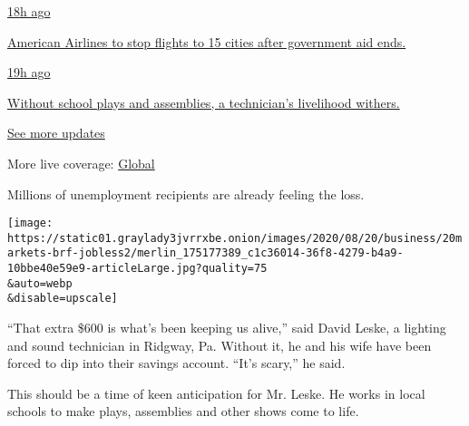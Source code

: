 \href{https://www.nytimes3xbfgragh.onion/live/2020/08/20/business/stock-market-today-coronavirus?action=click\&pgtype=Article\&state=default\&region=MAIN_CONTENT_1\&context=storylines_live_updates\#american-airlines-to-stop-flights-to-15-cities-after-government-aid-ends}{18h
ago}

\href{https://www.nytimes3xbfgragh.onion/live/2020/08/20/business/stock-market-today-coronavirus?action=click\&pgtype=Article\&state=default\&region=MAIN_CONTENT_1\&context=storylines_live_updates\#american-airlines-to-stop-flights-to-15-cities-after-government-aid-ends}{American
Airlines to stop flights to 15 cities after government aid ends.}

\href{https://www.nytimes3xbfgragh.onion/live/2020/08/20/business/stock-market-today-coronavirus?action=click\&pgtype=Article\&state=default\&region=MAIN_CONTENT_1\&context=storylines_live_updates\#without-school-plays-and-assemblies-a-technicians-livelihood-withers}{19h
ago}

\href{https://www.nytimes3xbfgragh.onion/live/2020/08/20/business/stock-market-today-coronavirus?action=click\&pgtype=Article\&state=default\&region=MAIN_CONTENT_1\&context=storylines_live_updates\#without-school-plays-and-assemblies-a-technicians-livelihood-withers}{Without
school plays and assemblies, a technician's livelihood withers.}

\href{https://www.nytimes3xbfgragh.onion/live/2020/08/20/business/stock-market-today-coronavirus?action=click\&pgtype=Article\&state=default\&region=MAIN_CONTENT_1\&context=storylines_live_updates}{See
more updates}

More live coverage:
\href{https://www.nytimes3xbfgragh.onion/2020/08/20/world/coronavirus-covid.html?action=click\&pgtype=Article\&state=default\&region=MAIN_CONTENT_1\&context=storylines_live_updates}{Global}

Millions of unemployment recipients are already feeling the loss.

\texttt{[image: https://static01.graylady3jvrrxbe.onion/images/2020/08/20/business/20markets-brf-jobless2/merlin\_175177389\_c1c36014-36f8-4279-b4a9-10bbe40e59e9-articleLarge.jpg?quality=75\\\&auto=webp\\\&disable=upscale]}

``That extra \$600 is what's been keeping us alive,'' said David Leske,
a lighting and sound technician in Ridgway, Pa. Without it, he and his
wife have been forced to dip into their savings account. ``It's scary,''
he said.

This should be a time of keen anticipation for Mr. Leske. He works in
local schools to make plays, assemblies and other shows come to life.

